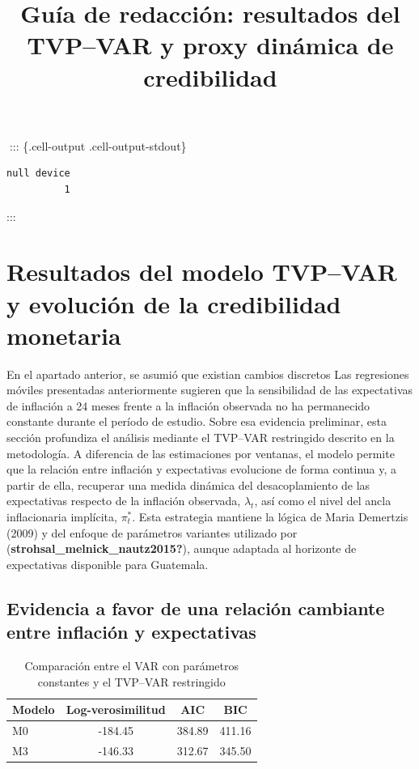 \documentclass[
  spanish,
  letterpaper,
  DIV=11,
  numbers=noendperiod]{scrartcl}
\title{Guía de redacción: resultados del TVP--VAR y proxy dinámica de
credibilidad}
\author{}
\date{}
\begin{document}
\maketitle


::: \{.cell-output .cell-output-stdout\}

\begin{verbatim}
null device 
          1 
\end{verbatim}

:::

\section{Resultados del modelo TVP--VAR y evolución de la credibilidad
monetaria}\label{resultados-del-modelo-tvpvar-y-evoluciuxf3n-de-la-credibilidad-monetaria}

En el apartado anterior, se asumió que existian cambios discretos Las
regresiones móviles presentadas anteriormente sugieren que la
sensibilidad de las expectativas de inflación a 24 meses frente a la
inflación observada no ha permanecido constante durante el período de
estudio. Sobre esa evidencia preliminar, esta sección profundiza el
análisis mediante el TVP--VAR restringido descrito en la metodología. A
diferencia de las estimaciones por ventanas, el modelo permite que la
relación entre inflación y expectativas evolucione de forma continua y,
a partir de ella, recuperar una medida dinámica del desacoplamiento de
las expectativas respecto de la inflación observada, \(\lambda_t\), así
como el nivel del ancla inflacionaria implícita, \(\pi_t^*\). Esta
estrategia mantiene la lógica de Maria Demertzis (2009) y del enfoque de
parámetros variantes utilizado por
(\textbf{strohsal\_melnick\_nautz2015?}), aunque adaptada al horizonte
de expectativas disponible para Guatemala.

\subsection{Evidencia a favor de una relación cambiante entre inflación
y
expectativas}\label{evidencia-a-favor-de-una-relaciuxf3n-cambiante-entre-inflaciuxf3n-y-expectativas}

\begin{longtable}[]{@{}lccc@{}}

\caption{\label{tbl-comparacion-m0-m3}Comparación entre el VAR con
parámetros constantes y el TVP--VAR restringido}

\tabularnewline

\toprule\noalign{}
Modelo & Log-verosimilitud & AIC & BIC \\
\midrule\noalign{}
\endhead
\bottomrule\noalign{}
\endlastfoot
M0 & -184.45 & 384.89 & 411.16 \\
M3 & -146.33 & 312.67 & 345.50 \\

\end{longtable}
\end{document}
